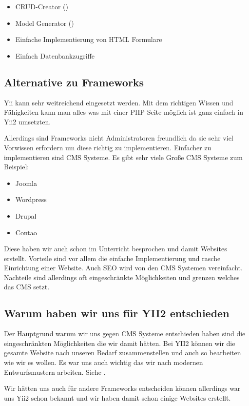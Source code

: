 	\begin{itemize}
		\item CRUD-Creator ()
		\item Model Generator ()
		\item Einfache Implementierung von HTML Formulare
		\item Einfach Datenbankzugriffe
	\end{itemize}

	\subsection{Alternative zu Frameworks}
	Yii kann sehr weitreichend eingesetzt werden. Mit dem richtigen Wissen und Fähigkeiten kann man alles was mit einer PHP Seite möglich ist ganz einfach in Yii2 umsetzten.

Allerdings sind Frameworks nicht Administratoren freundlich da sie sehr viel Vorwissen erfordern um diese richtig zu implementieren. Einfacher zu implementieren sind CMS Systeme. Es gibt sehr viele Große CMS Systeme zum Beispiel:

\begin{itemize}
\item Joomla
\item Wordpress
\item Drupal
\item Contao
\end{itemize}

Diese haben wir auch schon im Unterricht besprochen und damit Websites erstellt. Vorteile sind vor allem die einfache Implementierung und rasche Einrichtung einer Website. Auch SEO wird von den CMS Systemen vereinfacht. Nachteile sind allerdings oft eingeschränkte Möglichkeiten und grenzen welches das CMS setzt.

\subsection{Warum haben wir uns für YII2 entschieden}

Der Hauptgrund warum wir uns gegen CMS Systeme entschieden haben sind die eingeschränkten Möglichkeiten die wir damit hätten. Bei YII2 können wir die gesamte Website nach unseren Bedarf zusammenstellen und auch so bearbeiten wie wir es wollen. Es war uns auch wichtig das wir nach modernen Entwurfsmustern arbeiten. Siehe .

Wir hätten uns auch für andere Frameworks entscheiden können allerdings war uns Yii2 schon bekannt und wir haben damit schon einige Websites erstellt.

